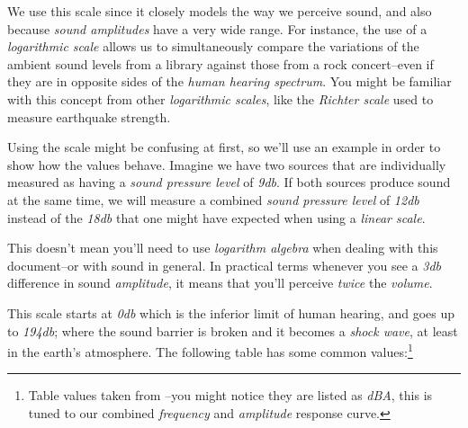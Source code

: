 \documentclass[10pt,a4paper]{report}
\newcommand{\dbSPL}[1]{\textit{\mbox{#1\acrshort{db}}}}
\begin{document}
We use this scale since it closely models the way we perceive sound, and also because \textit{sound amplitudes} have a very wide range. For instance, the use of a \textit{logarithmic scale} allows us to simultaneously compare the variations of the ambient sound levels from a library against those from a rock concert--even if they are in opposite sides of the \textit{human hearing spectrum}. You might be familiar with this concept from other \textit{logarithmic scales}, like the \textit{Richter scale} used to measure earthquake strength.

Using the scale might be confusing at first, so we'll use an example in order to show how the values behave. Imagine we have two sources that are individually measured as having a \textit{sound pressure level} of \dbSPL{9}. If both sources produce sound at the same time, we will measure a combined \textit{sound pressure level} of \dbSPL{12} instead of the \dbSPL{18} that one might have expected when using a \textit{linear scale}. 

This doesn't mean you'll need to use \textit{logarithm algebra} when dealing with this document--or with sound in general. In practical terms whenever you see a \dbSPL{3} difference in sound \textit{amplitude}, it means that you'll perceive \textit{twice} the \textit{volume}.

\newpage
This scale starts at \dbSPL{0} which is the inferior limit of human hearing, and goes up to \dbSPL{194}; where the sound barrier is broken and it becomes a \textit{shock wave}, at least in the earth's atmosphere. The following table has some common values:\footnote{Table values taken from \cite{noiselevels}--you might notice they are listed as \textit{dBA}, this is tuned to our combined \textit{frequency} and \textit{amplitude} response curve.}
\end{document}
